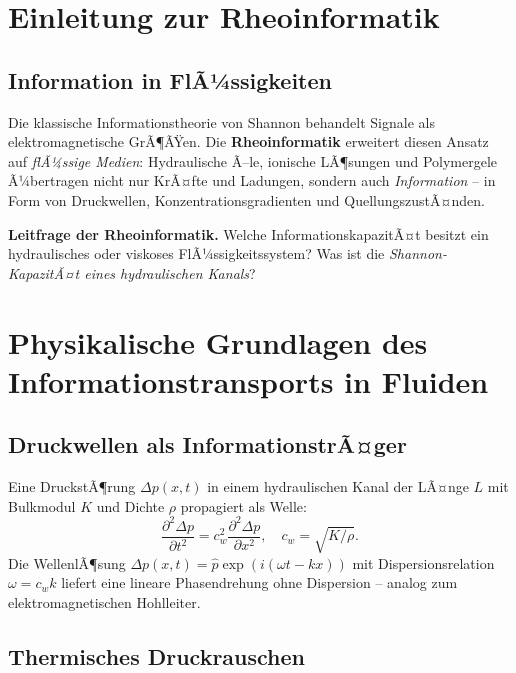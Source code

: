 ﻿\documentclass[a4paper,12pt]{scrreprt}
\theoremstyle{definition}
\begin{document}
\section{Einleitung zur Rheoinformatik}

\subsection{Information in FlÃ¼ssigkeiten}

Die klassische Informationstheorie von Shannon behandelt Signale als
elektromagnetische GrÃ¶ÃŸen. Die \textbf{Rheoinformatik} erweitert
diesen Ansatz auf \emph{flÃ¼ssige Medien}: Hydraulische Ã–le,
ionische LÃ¶sungen und Polymergele Ã¼bertragen nicht nur KrÃ¤fte und
Ladungen, sondern auch \emph{Information} -- in Form von Druckwellen,
Konzentrationsgradienten und QuellungszustÃ¤nden.

\begin{infobox}
\textbf{Leitfrage der Rheoinformatik.}
Welche InformationskapazitÃ¤t besitzt ein hydraulisches oder viskoses
FlÃ¼ssigkeitssystem? Was ist die \emph{Shannon-KapazitÃ¤t eines
hydraulischen Kanals}?
\end{infobox}

\section{Physikalische Grundlagen des Informationstransports in Fluiden}

\subsection{Druckwellen als InformationstrÃ¤ger}

Eine DruckstÃ¶rung $\Delta p(x,t)$ in einem hydraulischen Kanal der
LÃ¤nge $L$ mit Bulkmodul $K$ und Dichte $\rho$ propagiert als Welle:
\[
  \frac{\partial^2 \Delta p}{\partial t^2}
  = c_w^2 \frac{\partial^2 \Delta p}{\partial x^2},
  \quad c_w = \sqrt{K/\rho}.
\]
Die WellenlÃ¶sung $\Delta p(x,t) = \hat p \exp(i(\omega t - kx))$ mit
Dispersionsrelation $\omega = c_w k$ liefert eine lineare Phasendrehung
ohne Dispersion -- analog zum elektromagnetischen Hohlleiter.

\subsection{Thermisches Druckrauschen}
\end{document}
